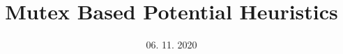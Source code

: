 \documentclass[a4paper, 10pt, oneside]{memoir}
\title				{Mutex Based Potential Heuristics}
\date				{06. 11. 2020}
\begin{document}

\thesisfront
\maketitle
\pagestyle{thesis}
% 
%
\thesistoc
\thesismain






%
%
\thesisappendix
\thesisbib
\begin{appendices}
	 
\end{appendices}
\thesisback

\end{document}
